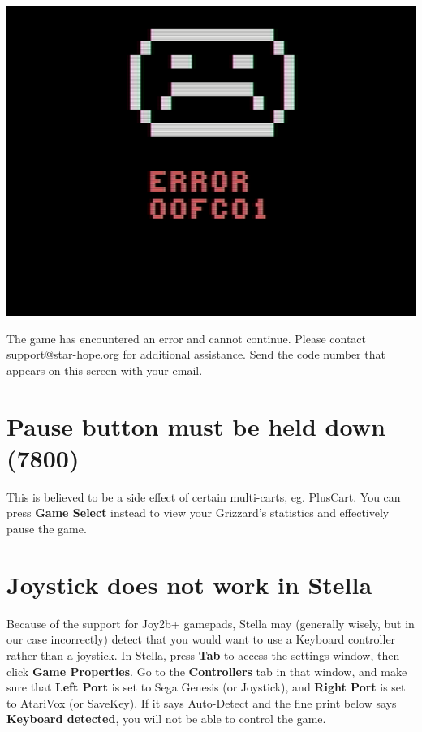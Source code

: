 \documentclass[10pt,twocolumn,openany,article]{memoir}
\begin{document}
\includegraphics[width=\columnwidth]{../Manual/WhiteSadFaceNTSC.png}

The game  has encountered an  error and cannot continue.  Please contact
\href{mailto:support@star-hope.org}{support@star-hope.org}           for
additional assistance. Send the code  number that appears on this screen
with your email.

\ifdefined\ATARIAGESAVE\else

\section*{Pause button must be held down (7800)}

This  is believed  to  be  a side  effect  of  certain multi-carts,  eg.
PlusCart.  You  can press  \textbf{Game  Select}  instead to  view  your
Grizzard's statistics and effectively pause the game.

\section*{Joystick does not work in Stella}

Because  of  the support  for  Joy2b+  gamepads, Stella  may  (generally
wisely, but in  our case incorrectly) detect that you  would want to use
a  Keyboard  controller  rather  than   a  joystick.  In  Stella,  press
\textbf{Tab}  to access  the  settings window,  then click  \textbf{Game
  Properties}. Go  to the \textbf{Controllers}  tab in that  window, and
make sure that \textbf{Left Port} is  set to Sega Genesis (or Joystick),
and \textbf{Right  Port} is  set to  AtariVox (or  SaveKey). If  it says
Auto-Detect and  the fine  print below says  \textbf{Keyboard detected},
you will not be able to control the game.
\end{document}
